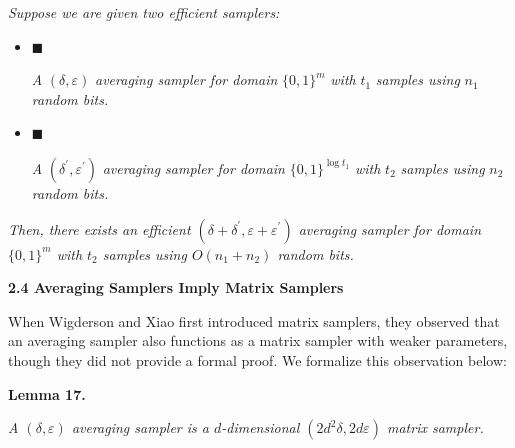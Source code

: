 \emph{Suppose we are given two efficient samplers:}\par


\begin{itemize}


\item[] 
$\blacksquare$ 


\emph{A }$(\delta,\varepsilon)$\emph{ averaging sampler for domain }$\{0,1\}^{m}$\emph{ with }$t_{1}$\emph{ samples using }$n_{1}$\emph{ random bits.}\par





\item[] 
$\blacksquare$ 


\emph{A }$(\delta^{\prime},\varepsilon^{\prime})$\emph{ averaging sampler for domain }$\{0,1\}^{\log t_{1}}$\emph{ with }$t_{2}$\emph{ samples using }$n_{2}$\emph{ random bits.}\par





\end{itemize}


\emph{Then, there exists an efficient $(\delta+\delta^{\prime},\varepsilon+\varepsilon^{\prime})$ averaging sampler for domain $\{0,1\}^{m}$ with $t_{2}$ samples using $O(n_{1}+n_{2})$ random bits.}\par







\par\medskip\noindent\textbf{
2.4 Averaging Samplers Imply Matrix Samplers}\par




When Wigderson and Xiao first introduced matrix samplers, they observed that an averaging sampler also functions as a matrix sampler with weaker parameters, though they did not provide a formal proof. We formalize this observation below:\par





\par\medskip\noindent\textbf{
\textbf{Lemma 17}\textbf{.}
}\par



\emph{A $(\delta,\varepsilon)$ averaging sampler is a $d$-dimensional $(2d^{2}\delta,2d\varepsilon)$ matrix sampler.}\par



